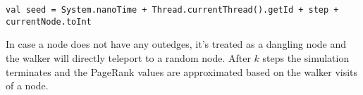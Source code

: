 \vspace{0.5em}
\newpage
\begin{lstlisting}[caption={Materializing and Unpersisting Walker RDD},
                   label={lst:walker},
                   captionpos=b] 
val seed = System.nanoTime + Thread.currentThread().getId + step + currentNode.toInt
\end{lstlisting}


\vspace{0.5em}

In case a node does not have any outedges, it's treated as a dangling node and the walker will directly teleport to a random node.
After $k$ steps the simulation terminates and the PageRank values are approximated based on the walker visits of a node.



